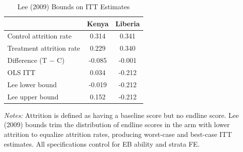 \begin{table}[!h]
\centering
\caption{Lee (2009) Bounds on ITT Estimates}
\label{tab:lee_bounds}
\begin{threeparttable}
\begin{tabular}[t]{lcc}
\toprule
 & Kenya & Liberia \\
\midrule
Control attrition rate & 0.314 & 0.341 \\
Treatment attrition rate & 0.229 & 0.340 \\
Difference (T $-$ C) & -0.085 & -0.001 \\
\addlinespace
OLS ITT &   0.034 &  -0.212 \\
\addlinespace
Lee lower bound &  -0.019 &  -0.212 \\
Lee upper bound &   0.152 &  -0.212 \\
\bottomrule
\end{tabular}
\begin{tablenotes}
\footnotesize
\item \textit{Notes:} Attrition is defined as having a baseline score but no endline score. Lee (2009) bounds trim the distribution of endline scores in the arm with lower attrition to equalize attrition rates, producing worst-case and best-case ITT estimates. All specifications control for EB ability and strata FE.
\end{tablenotes}
\end{threeparttable}
\end{table}
